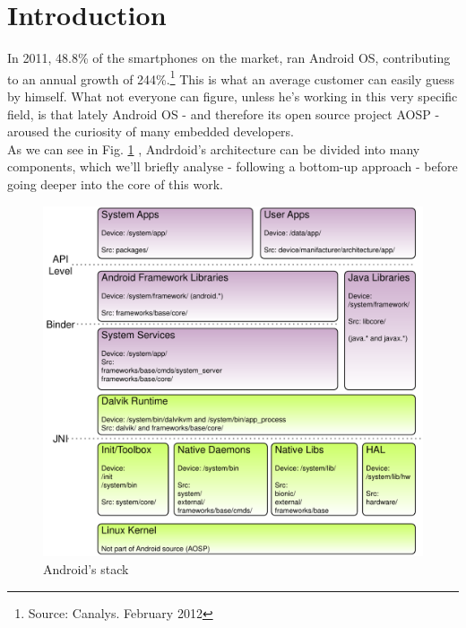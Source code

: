 
\section{Introduction}
In 2011, 48.8\% of the smartphones on the market, ran Android OS, contributing to an annual growth of 244\%.\footnote{Source: Canalys. February 2012} This is what an average customer can easily guess by himself. What not everyone can figure, unless he's working in this very specific field, is that lately Android OS - and therefore its open source project AOSP - aroused the curiosity of many embedded developers.\\
As we can see in Fig. \ref{fig:stack} \cite{gargenta}, Andrdoid's architecture can be divided into many components, which we'll briefly analyse - following a bottom-up approach - before going deeper into the core of this work.
\begin{figure}[!htb]
	\centering
	\includegraphics[scale=.6]{images/stack.pdf}
	\caption{Android's stack}
	\label{fig:stack}
\end{figure}
